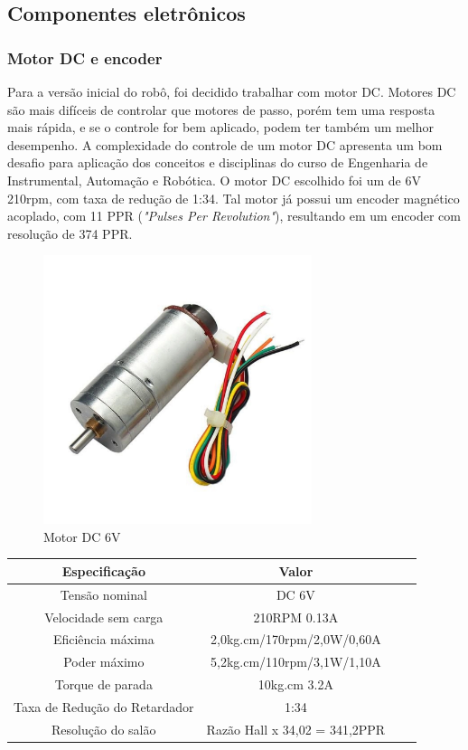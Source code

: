 \subsection{Componentes eletrônicos}

\subsubsection{Motor DC e encoder}
Para a versão inicial do robô, foi decidido trabalhar com motor DC.
Motores DC são mais difíceis de controlar que motores de passo, porém tem uma resposta mais rápida, e se o controle for
bem aplicado, podem ter também um melhor desempenho. A complexidade do controle de um motor DC apresenta um bom desafio
para aplicação dos conceitos e disciplinas do curso de Engenharia de Instrumental, Automação e Robótica. O motor DC 
escolhido foi um de 6V 210rpm, com taxa de redução de 1:34. Tal motor já possui um encoder magnético acoplado, com 11
PPR (\textit{"Pulses Per Revolution"}), resultando em um encoder com resolução de 374 PPR.

\begin{figure}[htb]
	\centering
	\includegraphics[width=0.7\textwidth]{figures/CHR_GM25_370}
	\caption{Motor DC 6V \cite{motor_dc_6v_encoder}}
\end{figure}

\begin{quadro}[htb]
\caption{\label{Especificacoes_motordc_6v}Especificações do motor DC 6V}
	 \begin{tabular}{|c|c|c|c|}
		\hline
		\textbf{Especificação} & \textbf{Valor} \\ \hline
		Tensão nominal & DC 6V  \\ \hline
		Velocidade sem carga  & 210RPM 0.13A  \\ \hline
		Eficiência máxima & 2,0kg.cm/170rpm/2,0W/0,60A   \\ \hline
		Poder máximo & 5,2kg.cm/110rpm/3,1W/1,10A   \\ \hline
		Torque de parada  & 10kg.cm 3.2A    \\ \hline
		Taxa de Redução do Retardador & 1:34  \\ \hline
		Resolução do salão & Razão Hall x 34,02 = 341,2PPR  \\ \hline
	\end{tabular}
\end{quadro}


